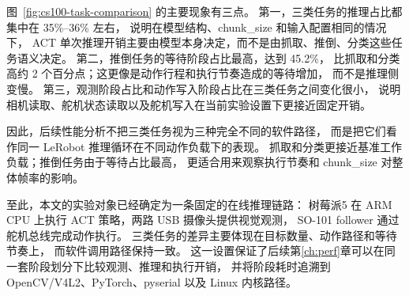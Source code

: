 图~\ref{fig:cs100-task-comparison} 的主要现象有三点。
第一，三类任务的推理占比都集中在 35\%--36\% 左右，
说明在模型结构、chunk\_size 和输入配置相同的情况下，
ACT 单次推理开销主要由模型本身决定，而不是由抓取、推倒、分类这些任务语义决定。
第二，推倒任务的等待阶段占比最高，达到 45.2\%，
比抓取和分类高约 2 个百分点；这更像是动作行程和执行节奏造成的等待增加，
而不是推理侧变慢。
第三，观测阶段占比和动作写入阶段占比在三类任务之间变化很小，
说明相机读取、舵机状态读取以及舵机写入在当前实验设置下更接近固定开销。

因此，后续性能分析不把三类任务视为三种完全不同的软件路径，
而是把它们看作同一 LeRobot 推理循环在不同动作负载下的表现。
抓取和分类更接近基准工作负载；推倒任务由于等待占比最高，
更适合用来观察执行节奏和 chunk\_size 对整体帧率的影响。

至此，本文的实验对象已经确定为一条固定的在线推理链路：
树莓派5 在 ARM CPU 上执行 ACT 策略，两路 USB 摄像头提供视觉观测，
SO-101 follower 通过舵机总线完成动作执行。
三类任务的差异主要体现在目标数量、动作路径和等待节奏上，
而软件调用路径保持一致。
这一设置保证了后续第\ref{ch:perf}章可以在同一套阶段划分下比较观测、推理和执行开销，
并将阶段耗时追溯到 OpenCV/V4L2、PyTorch、pyserial 以及 Linux 内核路径。
